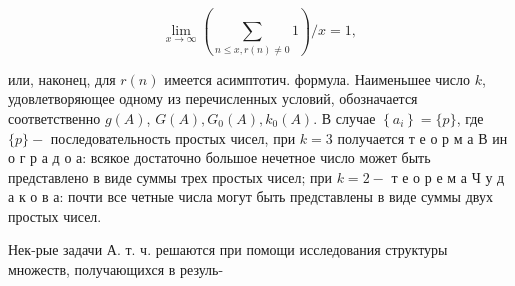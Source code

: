 \documentclass[10pt]{article}
\begin{document}
\[

\lim _{x \rightarrow \infty}\left(\sum_{n \leqslant x, r(n) \neq 0} 1\right) / x=1,

\]



или, наконец, для $r(n)$ имеется асимптотич. формула. Наименьшее число $k$, удовлетворяющее одному из перечисленных условий, обозначается соответственно $g(A)$, $G(A), G_{0}(A), k_{0}(A)$. В случае $\left\{a_{i}\right\}=\{p\}$, где $\{p\}-$ последовательность простых чисел, при $k=3$ получается т е о р м а В ин о г р а д о а: всякое достаточно большое нечетное число может быть представлено в виде суммы трех простых чисел; при $k=2-$ т е о р е м а Ч у д а к о в а: почти все четные числа могут быть представлены в виде суммы двух простых чисел.



Нек-рые задачи А. т. ч. решаются при помощи исследования структуры множеств, получающихся в резуль-
\end{document}
